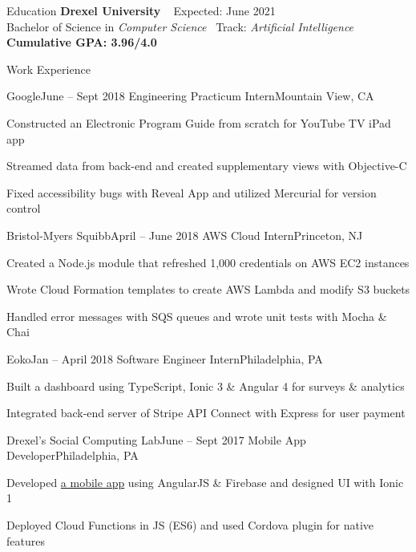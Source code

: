 \documentclass{resume} %
\begin{document}

\begin{rSection}{Education}
{\bf Drexel University}  
\hfill {Expected: June 2021} \\ 
Bachelor of Science in \textit{Computer Science }
\hfill  {Track: \textit{Artificial Intelligence}} \\
{\bf Cumulative GPA: 3.96/4.0}
\end{rSection}


\begin{rSection}{Work Experience}
\begin{rSubsection}{Google}{June -- Sept 2018}
{Engineering Practicum Intern}{Mountain View, CA}
\item Constructed an Electronic Program Guide from scratch for YouTube TV iPad app 
\item Streamed data from back-end and created supplementary views with Objective-C
\item Fixed accessibility bugs with Reveal App and utilized Mercurial for version control 
\end{rSubsection}

\begin{rSubsection}{Bristol-Myers Squibb}{April -- June 2018}
{AWS Cloud Intern}{Princeton, NJ}
\item Created a Node.js module that refreshed 1,000 credentials on AWS EC2 instances 
\item Wrote Cloud Formation templates to create AWS Lambda and modify S3 buckets 
\item Handled error messages with SQS queues and wrote unit tests with Mocha \& Chai
\end{rSubsection}


\begin{rSubsection}{Eoko}{Jan -- April 2018}
{Software Engineer Intern}{Philadelphia, PA} 
\item Built a dashboard using TypeScript, Ionic 3 \& Angular 4 for surveys \& analytics 
\item Integrated back-end server of Stripe API Connect with Express for user payment
\end{rSubsection}

\begin{rSubsection}{Drexel's Social Computing Lab}{June -- Sept 2017}
{Mobile App Developer}{Philadelphia, PA}
\item Developed \href{https://play.google.com/store/apps/details?id=buddy.project.com}{{a mobile app}} using AngularJS \& Firebase and designed UI with Ionic 1 
\item Deployed Cloud Functions in JS (ES6) and used Cordova plugin for native features
\end{rSubsection}
\end{rSection}
\end{document}
